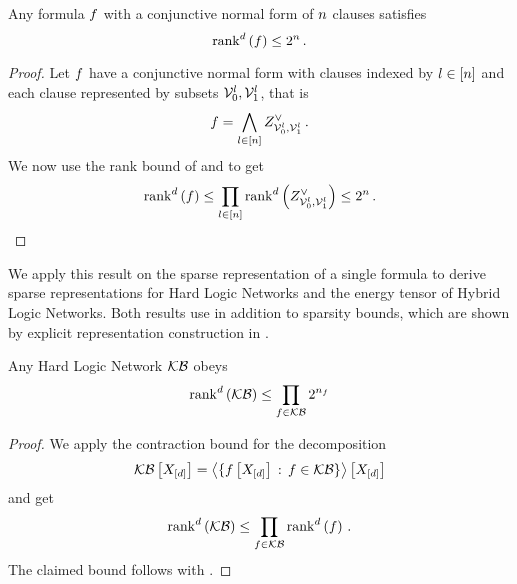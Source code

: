 \begin{theorem}\label{the:formulaSlicePolynomialDecomposition}
	Any formula $f$ with a conjunctive normal form of $n$ clauses satisfies
		\[ \mathrm{rank}^{d}\left(f\right) \leq 2^{n} \, . \]
\end{theorem}
\begin{proof}
	Let $f$ have a conjunctive normal form with clauses indexed by $l\in[n]$ and each clause represented by subsets $\mathcal{V}_0^l, \mathcal{V}_1^l$, that is
		\[ f = \bigwedge_{l\in[n]} Z^{\lor}_{\mathcal{V}_0^l,\mathcal{V}_1^l} \, . \]
	We now use the rank bound of  and  to get
	\begin{align*}
		\mathrm{rank}^{d}\left(f\right) \leq \prod_{l\in[n]} \mathrm{rank}^{d}\left(Z^{\lor}_{\mathcal{V}_0^l,\mathcal{V}_1^l}\right) \leq 2^{n} \, .
	\end{align*}
\end{proof}

We apply this result on the sparse representation of a single formula to derive sparse representations for Hard Logic Networks and the energy tensor of Hybrid Logic Networks.
Both results use in addition to  sparsity bounds, which are shown by explicit representation construction in .

\begin{corollary}
	Any Hard Logic Network $\mathcal{KB}$ obeys
	\begin{align*}
		\mathrm{rank}^{d}\left(\mathcal{KB}\right) \leq \prod_{f\in\mathcal{KB}} 2^{n_{f}}
\end{align*}
\end{corollary}
\begin{proof}
	We apply the contraction bound  for the decomposition
	\begin{align*}
		\mathcal{KB}\left[X_{[d]}\right] = \left\langle \{f\left[X_{[d]}\right] \, : \, f\in\mathcal{KB}\}\right\rangle \left[ X_{[d]} \right]
	\end{align*}
	and get
	\begin{align*}
		\mathrm{rank}^{d}\left(\mathcal{KB}\right) \leq \prod_{f\in\mathcal{KB}} \mathrm{rank}^{d}\left(f\right) \, .
	\end{align*}
	The claimed bound follows with .
\end{proof}

